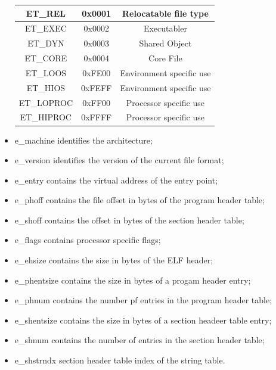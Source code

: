 \begin{itemize}
\begin{center}
\begin{tabular}{|c|c|c|}
            \hline {\ttfamily ET\_REL} & 0x0001 & Relocatable file type \\
            \hline {\ttfamily ET\_EXEC} & 0x0002 & Executabler \\
            \hline {\ttfamily ET\_DYN} & 0x0003 & Shared Object \\
            \hline {\ttfamily ET\_CORE} & 0x0004 & Core File \\
            \hline {\ttfamily ET\_LOOS} & 0xFE00 & Environment specific use \\
            \hline {\ttfamily ET\_HIOS} & 0xFEFF & Environment specific use\\
            \hline {\ttfamily ET\_LOPROC} & 0xFF00 & Processor specific use\\
            \hline {\ttfamily ET\_HIPROC} & 0xFFFF & Processor specific use\\
            \hline 
        \end{tabular} 
    \end{center} 
    \item {\ttfamily e\_machine} identifies the architecture;
    \item {\ttfamily e\_version} identifies the version of the current file format;
    \item {\ttfamily e\_entry} contains the virtual address of the entry point;
    \item {\ttfamily e\_phoff} contains the file offset in bytes of the program header table;
    \item {\ttfamily e\_shoff} contains the offset in bytes of the section header table;
    \item {\ttfamily e\_flags} contains processor specific flags;
    \item {\ttfamily e\_ehsize} contains the size in bytes of the ELF header;
    \item {\ttfamily e\_phentsize} contains the size in bytes of a progam header entry;
    \item {\ttfamily e\_phnum} contains the number pf entries in the program header table;
    \item {\ttfamily e\_shentsize} contains the size in bytes of a section headeer table entry;
    \item {\ttfamily e\_shnum} contains the number of entries in the section header table;
    \item {\ttfamily e\_shstrndx} section header table index of the string table.
\end{itemize}
